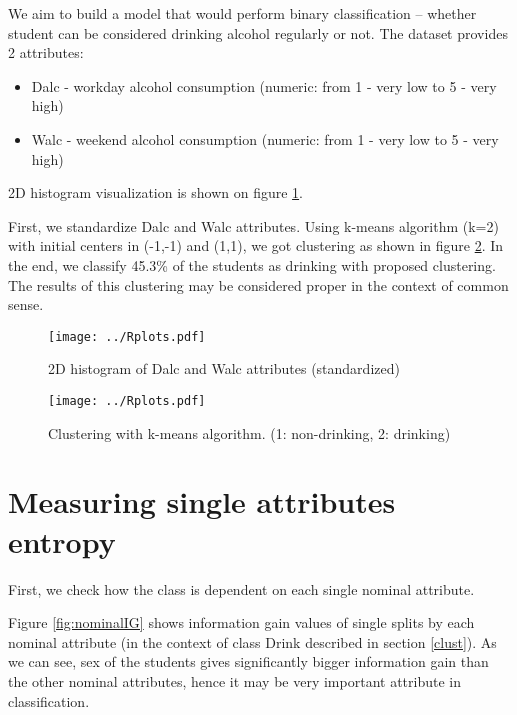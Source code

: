 \documentclass[a4paper]{article}
\begin{document}
We aim to build a model that would perform binary classification --
whether student can be considered drinking alcohol regularly or not.
The dataset provides 2 attributes:
\begin{itemize}
    \item Dalc - workday alcohol consumption (numeric: from 1 - very low to 5 - very high)
    \item Walc - weekend alcohol consumption (numeric: from 1 - very low to 5 - very high)
\end{itemize}
2D histogram visualization is shown on figure \ref{fig:hist2D}.

First, we standardize Dalc and Walc attributes.
Using k-means algorithm (k=2) with initial centers in (-1,-1) and (1,1), we got clustering as shown in figure \ref{fig:clust}.
In the end, we classify 45.3\% of the students as drinking with proposed clustering.
The results of this clustering may be considered proper in the context of common sense.



\begin{figure}[!hbt]
    \centering
    \texttt{[image: ../Rplots.pdf]}
    \caption[]{2D histogram of Dalc and Walc attributes (standardized)
    \label{fig:hist2D}
    }
\end{figure}

\begin{figure}[!hbt]
    \centering
    \texttt{[image: ../Rplots.pdf]}
    \caption[]{Clustering with k-means algorithm. (1: non-drinking, 2: drinking)
    \label{fig:clust}
    }
\end{figure}

\section{Measuring single attributes entropy}
\label{xent}
First, we check how the class is dependent on each single nominal attribute.

Figure \ref{fig:nominalIG} shows information gain values
of single splits by each nominal attribute (in the context of class Drink described in section \ref{clust}).
As we can see, sex of the students gives significantly bigger information gain
than the other nominal attributes, hence it may be very important attribute
in classification.
\end{document}
